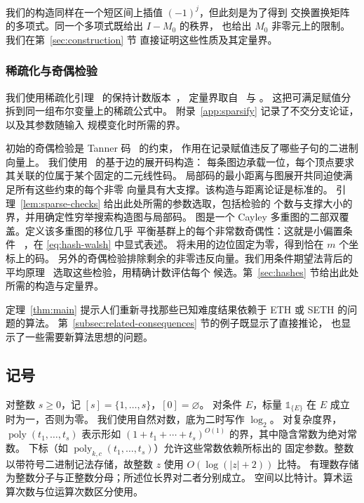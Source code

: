 \documentclass[11pt,reqno]{amsart}
\numberwithin{equation}{section}
\theoremstyle{definition}\newtheorem{definition}[theorem]{定义}
\theoremstyle{remark}\newtheorem{remark}[theorem]{注}
\newcommand{\poly}{\operatorname{poly}}
\renewcommand{\ge}{\geqslant}
\begin{document}
我们的构造同样在一个短区间上插值 $(-1)^j$，但此刻是为了得到
交换置换矩阵的多项式。同一个多项式既给出 $I-M_0$ 的秩界，
也给出 $M_0$ 非零元上的限制。我们在第~\ref{sec:construction} 节
直接证明这些性质及其定量界。

\subsubsection{稀疏化与奇偶检验}\label{subsec:related-reductions}
我们使用稀疏化引理~\cite{IPZ} 的保持计数版本~\cite[Appendix~A]{DHMTW}，
定量界取自~\cite[Section~6]{CIP} 与
\cite[Lemma~5.14 and equation~(5.4)]{CalabroThesis}。
这把可满足赋值分拆到同一组布尔变量上的稀疏公式中。
附录~\ref{app:sparsify} 记录了不交分支论证，以及其参数随输入
规模变化时所需的界。

初始的奇偶检验是 Tanner 码~\cite[Section~II]{Tanner81} 的约束，
作用在记录赋值违反了哪些子句的二进制向量上。
我们使用~\cite[Sections~IV and~VI]{SS96} 的基于边的展开码构造：
每条图边承载一位，每个顶点要求其关联的位属于某个固定的二元线性码。
局部码的最小距离与图展开共同迫使满足所有这些约束的每个非零
向量具有大支撑。该构造与距离论证是标准的。
引理~\ref{lem:sparse-checks} 给出此处所需的参数选取，包括检验的
个数与支撑大小的界，并用确定性穷举搜索构造图与局部码。
图是一个 Cayley 多重图的二部双覆盖。定义该多重图的移位几乎
平衡基群上的每个非常数奇偶性：这就是小偏置条件
~\cite{NN93,AR94}，在 \eqref{eq:hash-walsh} 中显式表述。
将未用的边位固定为零，得到恰在 $m$ 个坐标上的码。
另外的奇偶检验排除剩余的非零违反向量。我们用条件期望法背后的
平均原理~\cite{Raghavan88} 选取这些检验，用精确计数评估每个
候选。第~\ref{sec:hashes} 节给出此处所需的构造与定量界。

定理~\ref{thm:main} 提示人们重新寻找那些已知难度结果依赖于
ETH 或 SETH 的问题的算法。
第~\ref{subsec:related-consequences} 节的例子既显示了直接推论，
也显示了一些需要新算法思想的问题。

\subsection{记号}\label{subsec:notation}
对整数 $s\ge0$，记 $[s]=\{1,\ldots,s\}$，$[0]=\varnothing$。
对条件 $E$，标量 $\mathds{1}_{\{E\}}$ 在 $E$ 成立时为一，否则为零。
我们使用自然对数，底为二时写作 $\log_2$。
对复杂度界，$\poly(t_1,\ldots,t_s)$ 表示形如
$(1+t_1+\cdots+t_s)^{O(1)}$ 的界，其中隐含常数为绝对常数。
下标（如 $\poly_{k,c}(t_1,\ldots,t_s)$）允许这些常数依赖所标出的
固定参数。整数以带符号二进制记法存储，故整数 $z$ 使用
$O(\log(|z|+2))$ 比特。
有理数存储为整数分子与正整数分母；所述位长界对二者分别成立。
空间以比特计。算术运算次数与位运算次数区分使用。
\end{document}
